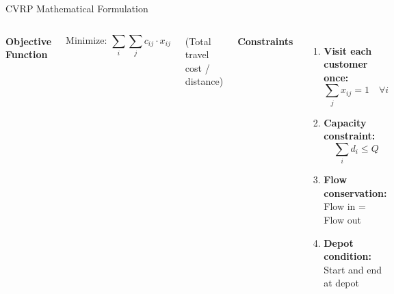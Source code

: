 \documentclass{beamer}
\begin{document}
\begin{frame}{CVRP Mathematical Formulation}

\begin{columns}[T]


\textbf{Objective Function}

\begin{equation*}
\text{Minimize: } \sum_{i} \sum_{j} c_{ij} \cdot x_{ij}
\end{equation*}

\small (Total travel cost / distance)

\vspace{0.5cm}


\textbf{Constraints}

\begin{enumerate}
\item \textbf{Visit each customer once:}
\[
\sum_{j} x_{ij} = 1 \quad \forall i
\]

\item \textbf{Capacity constraint:}
\[
\sum_{i} d_i \leq Q
\]

\item \textbf{Flow conservation:} \\
Flow in = Flow out

\item \textbf{Depot condition:} \\
Start and end at depot

\end{enumerate}

\end{columns}

\end{frame}
\end{document}
